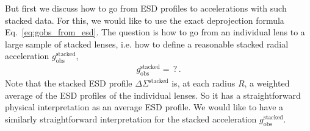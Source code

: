 \documentclass[a4paper,11pt]{article}
\begin{document}
But first we discuss how to go from ESD profiles to accelerations with such stacked data.
For this, we would like to use the exact deprojection formula Eq.~\eqref{eq:gobs_from_esd}.
The question is how to go from an individual lens to a large sample of stacked lenses, i.e. how to define a reasonable stacked radial acceleration $g_{\mathrm{obs}}^{\mathrm{stacked}}$,
\begin{align}
 g_{\mathrm{obs}}^{\mathrm{stacked}} = \, ? \,.
\end{align}
Note that the stacked ESD profile $\Delta \Sigma^{\mathrm{stacked}}$ is, at each radius $R$, a weighted average of the ESD profiles of the individual lenses.
So it has a straightforward physical interpretation as an average ESD profile.
We would like to have a similarly straightforward interpretation for the stacked acceleration $g_{\mathrm{obs}}^{\mathrm{stacked}}$.
\end{document}
